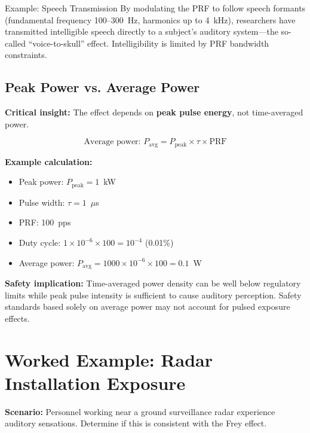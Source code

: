 \begin{calloutbox}{Example: Speech Transmission}
By modulating the PRF to follow speech formants (fundamental frequency 100--300~Hz, harmonics up to 4~kHz), researchers have transmitted intelligible speech directly to a subject's auditory system---the so-called ``voice-to-skull'' effect. Intelligibility is limited by PRF bandwidth constraints.
\end{calloutbox}

\subsection{Peak Power vs. Average Power}

\textbf{Critical insight:} The effect depends on \textbf{peak pulse energy}, not time-averaged power.

\begin{equation}
\text{Average power: } P_{\text{avg}} = P_{\text{peak}} \times \tau \times \text{PRF}
\label{eq:frey-avg-power}
\end{equation}

\textbf{Example calculation:}
\begin{itemize}
\item Peak power: $P_{\text{peak}} = 1$~kW
\item Pulse width: $\tau = 1$~$\mu$s
\item PRF: 100~pps
\item Duty cycle: $1 \times 10^{-6} \times 100 = 10^{-4}$ (0.01\%)
\item Average power: $P_{\text{avg}} = 1000 \times 10^{-6} \times 100 = 0.1$~W
\end{itemize}

\begin{warningbox}
\textbf{Safety implication:} Time-averaged power density can be well below regulatory limits while peak pulse intensity is sufficient to cause auditory perception. Safety standards based solely on average power may not account for pulsed exposure effects.
\end{warningbox}

\section{Worked Example: Radar Installation Exposure}

\textbf{Scenario:} Personnel working near a ground surveillance radar experience auditory sensations. Determine if this is consistent with the Frey effect.

